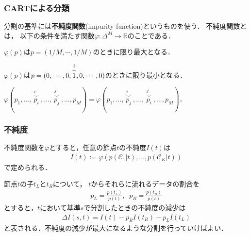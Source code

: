 \documentclass[10pt,hyperref={unicode}]{beamer}
\newenvironment{wideenumerate}{\enumerate\addtolength{\itemsep}{1em}}{\endenumerate}
\newcommand{\parentheses}[1]{\left(#1\right)}
\begin{document}
\begin{frame}
\frametitle{CARTによる分類}
分割の基準には\textbf{不純度関数}(impurity function)というものを使う．
不純度関数とは，
以下の条件を満たす関数$\varphi : \varDelta^M \to \mathbb{R}$のことである．

\bigskip

\begin{wideenumerate}
    \item $\varphi\parentheses{p}$は$p = \parentheses{1/M, \cdots, 1/M}$のときに限り最大となる．
    \item $\varphi\parentheses{p}$は$p = (0, \cdots, 0, \raisebox{.7pt}{$\stackrel{\substack{i \\ \smallsmile}}{1}$}, 0, \cdots, 0)$のときに限り最小となる．
    \item $\varphi(p_1,\ldots,\stackrel{\substack{i \\ \smallsmile}}{p_i},\ldots,
        \stackrel{\substack{j \\ \smallsmile}}{p_j},\ldots, p_M)
        = \varphi(p_1,\ldots,\stackrel{\substack{i \\ \smallsmile}}{p_j},\ldots,
        \stackrel{\substack{j \\ \smallsmile}}{p_i},\ldots, p_M)$．
\end{wideenumerate}

\end{frame}

\begin{frame}
\frametitle{不純度}
不純度関数を$\varphi$とすると，任意の節点$t$の不純度$I\parentheses{t}$は
\begin{align*}
    I\parentheses{t}
    := \varphi\parentheses{p\parentheses{\mathcal{C}_1|t},\ldots,p\parentheses{\mathcal{C}_K|t}}
\end{align*}
で定められる．

\bigskip

節点$t$の子$t_L$と$t_R$について，
$t$からそれらに流れるデータの割合を
\begin{align*}
    p_L = \frac{p\parentheses{t_L}}{p\parentheses{t}},
    \;\; p_R = \frac{p\parentheses{t_R}}{p\parentheses{t}}
\end{align*}
とすると，$t$において基準$s$で分割したときの不純度の減少は
\begin{align*}
    \Delta I\parentheses{s, t}
    = I\parentheses{t} - p_R I\parentheses{t_R}
    - p_L I\parentheses{t_L}
\end{align*}
と表される．不純度の減少が最大になるような分割を行っていけばよい．
\end{frame}
\end{document}
